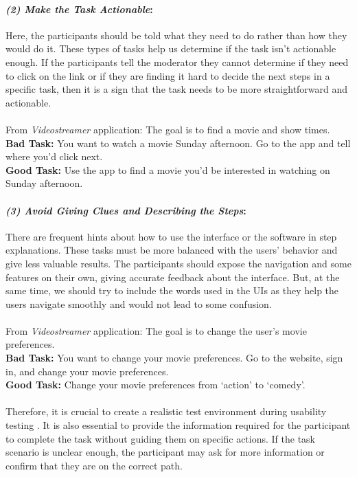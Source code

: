 \paragraph{\textit{(2) Make the Task Actionable}:}
Here, the participants should be told what they need to do rather than how they would do it.
These types of tasks help us determine if the task isn’t actionable enough.  
If the participants tell the moderator they cannot determine if they need to click on the link or if they are finding it hard to decide the next steps in a specific task, then it is a sign that the task needs to be more straightforward and actionable. \\\\
From \textit{Videostreamer} application: The goal is to find a movie and show times. \\
\textbf{Bad Task: } You want to watch a movie Sunday afternoon. Go to the app and tell where you’d click next. \\
\textbf{Good Task: } Use the app to find a movie you’d be interested in watching on Sunday afternoon. \\

\paragraph{\textit{(3) Avoid Giving Clues and Describing the Steps}:}
There are frequent hints about how to use the interface or the software in step explanations.
These tasks must be more balanced with the users' behavior and give less valuable results.   
The participants should expose the navigation and some features on their own, giving accurate feedback about the interface.
But, at the same time, we should try to include the words used in the UIs as they help the users navigate smoothly and would not lead to some confusion. \\\\
From \textit{Videostreamer} application: The goal is to change the user's movie preferences. \\
\textbf{Bad Task: } You want to change your movie preferences. Go to the website, sign in, and change your movie preferences. \\
\textbf{Good Task: } Change your movie preferences from `action' to `comedy'. \\\\
Therefore, it is crucial to create a realistic test environment during usability testing \cite{article:usability:doesburg}. 
It is also essential to provide the information required for the participant to complete the task without guiding them on specific actions. 
If the task scenario is unclear enough, the participant may ask for more information or confirm that they are on the correct path.


